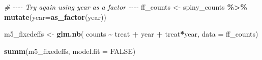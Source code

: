 \documentclass[
]{article}
\newenvironment{Shaded}{\begin{snugshade}}{\end{snugshade}}
\newcommand{\AttributeTok}[1]{\textcolor[rgb]{0.13,0.29,0.53}{#1}}
\newcommand{\CommentTok}[1]{\textcolor[rgb]{0.56,0.35,0.01}{\textit{#1}}}
\newcommand{\ConstantTok}[1]{\textcolor[rgb]{0.56,0.35,0.01}{#1}}
\newcommand{\FunctionTok}[1]{\textcolor[rgb]{0.13,0.29,0.53}{\textbf{#1}}}
\newcommand{\NormalTok}[1]{#1}
\newcommand{\OtherTok}[1]{\textcolor[rgb]{0.56,0.35,0.01}{#1}}
\newcommand{\SpecialCharTok}[1]{\textcolor[rgb]{0.81,0.36,0.00}{\textbf{#1}}}
\begin{document}
\begin{Shaded}
\begin{Highlighting}[]
\CommentTok{\# {-}{-}{-}{-} Try again using \textquotesingle{}year\textquotesingle{} as a factor {-}{-}{-}{-}}
\NormalTok{ff\_counts }\OtherTok{\textless{}{-}}\NormalTok{ spiny\_counts }\SpecialCharTok{\%\textgreater{}\%} 
    \FunctionTok{mutate}\NormalTok{(}\AttributeTok{year=}\FunctionTok{as\_factor}\NormalTok{(year))}
    
\NormalTok{m5\_fixedeffs }\OtherTok{\textless{}{-}} \FunctionTok{glm.nb}\NormalTok{(}
\NormalTok{    counts }\SpecialCharTok{\textasciitilde{}} 
\NormalTok{        treat }\SpecialCharTok{+}
\NormalTok{        year }\SpecialCharTok{+}
\NormalTok{        treat}\SpecialCharTok{*}\NormalTok{year,}
    \AttributeTok{data =}\NormalTok{ ff\_counts)}

\FunctionTok{summ}\NormalTok{(m5\_fixedeffs, }\AttributeTok{model.fit =} \ConstantTok{FALSE}\NormalTok{)}
\end{Highlighting}
\end{Shaded}
\end{document}
